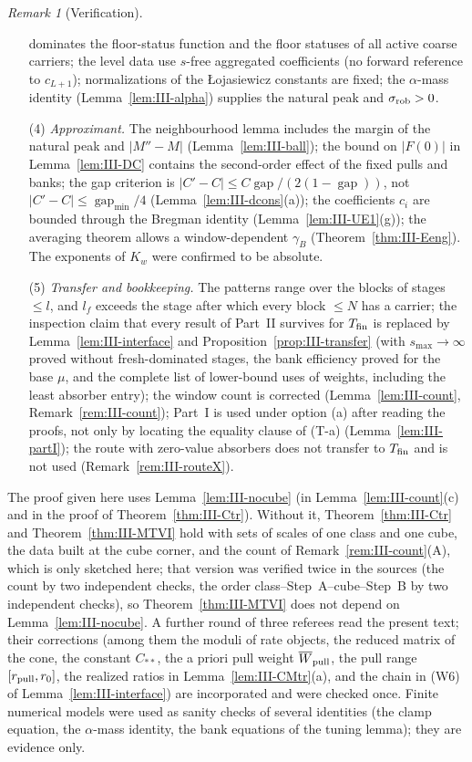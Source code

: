 \documentclass[10pt]{amsart}
\theoremstyle{definition}
\theoremstyle{remark}
\newtheorem{remark}[theorem]{Remark}
\newcommand{\gap}{\operatorname{gap}}
\begin{document}
\begin{remark}[Verification]
\begin{enumerate}
dominates the floor-status function and the floor statuses of all active
coarse carriers; the level data use $s$-free aggregated coefficients (no
forward reference to $c_{L+1}$); normalizations of the {\L}ojasiewicz constants
are fixed; the $\alpha$-mass identity (Lemma~\ref{lem:III-alpha}) supplies the
natural peak and $\sigma_{\rm rob}>0$.
\item[(4)] \emph{Approximant.}  The neighbourhood lemma includes the margin of
the natural peak and $|M''-M|$ (Lemma~\ref{lem:III-ball}); the bound on
$|F(0)|$ in Lemma~\ref{lem:III-DC} contains the second-order effect of the fixed
pulls and banks; the gap criterion is $|C'-C|\le C\gap/(2(1-\gap))$, not
$|C'-C|\le\gap_{\min}/4$ (Lemma~\ref{lem:III-dcons}(a)); the coefficients $c_i$ are
bounded through the Bregman identity (Lemma~\ref{lem:III-UE1}(g)); the averaging
theorem allows a window-dependent $\gamma_B$ (Theorem~\ref{thm:III-Eeng}).  The
exponents of $K_w$ were confirmed to be absolute.
\item[(5)] \emph{Transfer and bookkeeping.}  The patterns range over the blocks
of stages $\le l$, and $l_f$ exceeds the stage after which every block $\le N$
has a carrier; the inspection claim that every result of Part~II survives for
$T_{\rm fin}$ is replaced by Lemma~\ref{lem:III-interface} and
Proposition~\ref{prop:III-transfer} (with $s_{\max}\to\infty$ proved without
fresh-dominated stages, the bank efficiency proved for the base $\mu$, and the
complete list of lower-bound uses of weights, including the least absorber
entry); the window count is corrected (Lemma~\ref{lem:III-count},
Remark~\ref{rem:III-count}); Part~I is used under option (a) after reading the
proofs, not only by locating the equality clause of (T-a)
(Lemma~\ref{lem:III-partI}); the route with zero-value absorbers does not
transfer to $T_{\rm fin}$ and is not used (Remark~\ref{rem:III-routeX}).
\end{enumerate}
The proof given here uses Lemma~\ref{lem:III-nocube} (in
Lemma~\ref{lem:III-count}(c) and in the proof of Theorem~\ref{thm:III-Ctr}).
Without it, Theorem~\ref{thm:III-Ctr} and Theorem~\ref{thm:III-MTVI} hold with
sets of scales of one class and one cube, the data built at the cube corner,
and the count of Remark~\ref{rem:III-count}(A), which is only sketched here;
that version was verified twice in the sources (the count by two
independent checks, the order class--Step~A--cube--Step~B by two
independent checks), so Theorem~\ref{thm:III-MTVI} does not depend on
Lemma~\ref{lem:III-nocube}.  A further round of three referees read the
present text; their corrections (among them the moduli of rate objects,
the reduced matrix of the cone, the constant $C_{**}$, the a priori pull
weight $\overline W_{\rm pull}$, the pull range $[r_{\rm pull},r_0]$, the realized
ratios in Lemma~\ref{lem:III-CMtr}(a), and the chain in (W6) of
Lemma~\ref{lem:III-interface}) are incorporated and were checked once.  Finite
numerical models were used as sanity checks of several identities (the clamp
equation, the $\alpha$-mass identity, the bank equations of the tuning lemma);
they are evidence only.
\end{remark}
\end{document}
